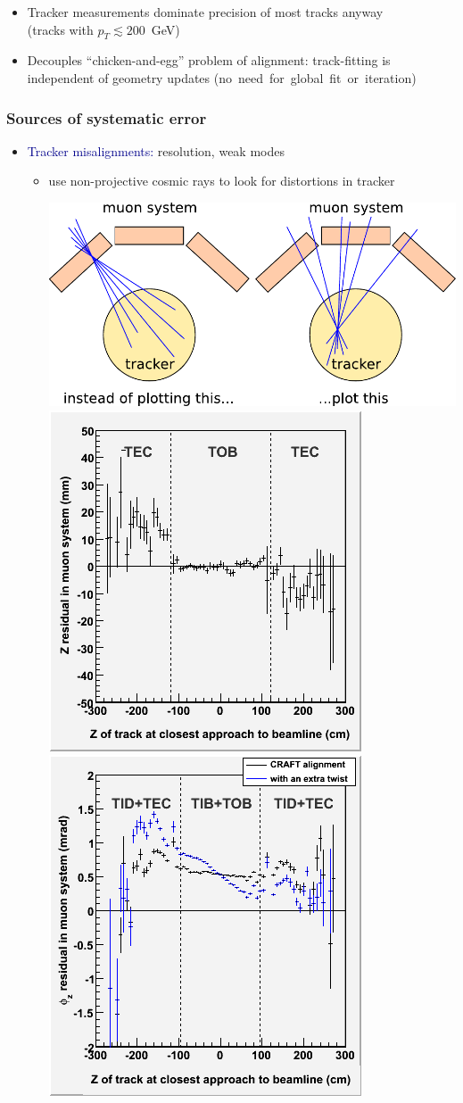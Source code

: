 \documentclass[compress]{beamer}
\begin{document}
\begin{frame}
\begin{itemize}
\vspace{0.1 cm}
\item Tracker measurements dominate precision of most tracks anyway \\ (tracks with $p_T \lesssim 200$~GeV)
\item Decouples ``chicken-and-egg'' problem of alignment: track-fitting is independent of geometry updates \mbox{(no need for global fit or iteration)\hspace{-1 cm}}
\end{itemize}
\end{frame}

\begin{frame}
\frametitle{Sources of systematic error}

\begin{itemize}\setlength{\itemsep}{0.5 cm}
\item \textcolor{darkblue}{Tracker misalignments:} resolution, weak modes
\begin{itemize}\setlength{\itemsep}{0.1 cm}
\item use non-projective cosmic rays to look for distortions in tracker

\vspace{0.3 cm}
\begin{minipage}{1.2\linewidth}
\hspace{-2 cm}
\includegraphics[height=3 cm]{tracker_xray.pdf}
\includegraphics[height=3 cm]{zresid_from_tracker_outerbottom.png}
\includegraphics[height=3 cm]{phiresid_from_tracker_inner_twist2.png}
\end{minipage}


\end{itemize}
\end{itemize}
\end{frame}
\end{document}
